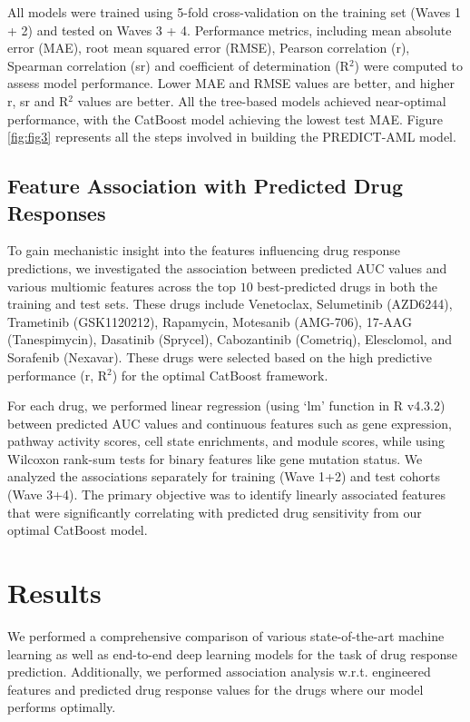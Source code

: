 \documentclass[pdflatex,sn-mathphys-num]{sn-jnl}%
\theoremstyle{thmstyleone}%
\theoremstyle{thmstyletwo}%
\theoremstyle{thmstylethree}%
\begin{document}
All models were trained using 5-fold cross-validation on the training set (Waves 1 + 2) and tested on Waves 3 + 4. Performance metrics, including mean absolute error (MAE), root mean squared error (RMSE), Pearson correlation (r), Spearman correlation (sr) and coefficient of determination (R$^2$) were computed to assess model performance. Lower MAE and RMSE values are better, and higher r, sr and R$^2$ values are better.  All the tree-based models achieved near-optimal performance, with the CatBoost model achieving the lowest test MAE. Figure \ref{fig:fig3} represents all the steps involved in building the PREDICT-AML model.
\subsection{Feature Association with Predicted Drug Responses}
To gain mechanistic insight into the features influencing drug response predictions, we investigated the association between predicted AUC values and various multiomic features across the top $10$ best-predicted drugs in both the training and test sets. These drugs include Venetoclax, Selumetinib (AZD6244), Trametinib (GSK1120212), Rapamycin, Motesanib (AMG-706), 17-AAG (Tanespimycin), Dasatinib (Sprycel), Cabozantinib (Cometriq), Elesclomol, and Sorafenib (Nexavar). These drugs were selected based on the high predictive performance (r, R$^2$) for the optimal CatBoost framework.

For each drug, we performed linear regression (using `lm' function in R v4.3.2) between predicted AUC values and continuous features such as gene expression, pathway activity scores, cell state enrichments, and module scores, while using Wilcoxon rank-sum tests for binary features like gene mutation status. We analyzed the associations separately for training (Wave 1+2) and test cohorts (Wave 3+4). The primary objective was to identify linearly associated features that were significantly correlating with predicted drug sensitivity from our optimal CatBoost model.
\section{Results}
We performed a comprehensive comparison of various state-of-the-art machine learning as well as end-to-end deep learning models for the task of drug response prediction. Additionally, we performed association analysis w.r.t. engineered features and predicted drug response values for the drugs where our model performs optimally.
\end{document}
